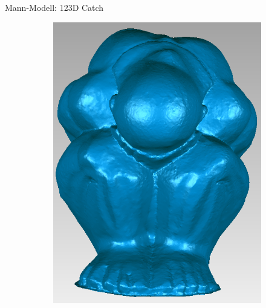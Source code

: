 \documentclass[11pt]{beamer}
\begin{document}
\begin{frame}{Mann-Modell: 123D Catch}
	\begin{figure}
		\begin{subfigure}{0.4\textwidth}
			\includegraphics[width=\textwidth]{images/Mann_SFM_Front}
		\end{subfigure}
		\begin{subfigure}{0.4\textwidth}

\end{subfigure}
\end{figure}
\end{frame}
\end{document}

